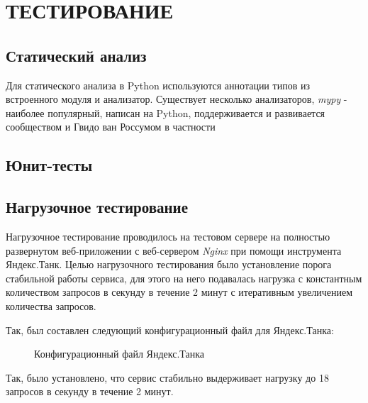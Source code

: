 \section{ТЕСТИРОВАНИЕ}
    \subsection{Статический анализ}
    Для статического анализа в Python используются аннотации типов из встроенного 
    модуля  и анализатор. Существует несколько анализаторов,
    \textit{mypy} - наиболее популярный, написан на Python, поддерживается и
    развивается сообществом и Гвидо ван Россумом в частности
    \subsection{Юнит-тесты}


    \subsection{Нагрузочное тестирование}
    Нагрузочное тестирование проводилось на тестовом сервере на полностью
    развернутом веб-приложении с веб-сервером \textit{Nginx} при помощи
    инструмента Яндекс.Танк. Целью нагрузочного тестирования было установление
    порога стабильной работы сервиса, для этого на него подавалась нагрузка
    с константным количеством запросов в секунду в течение 2 минут с итеративным
    увеличением количества запросов.

    Так, был составлен следующий конфигурационный файл для Яндекс.Танка:
    \begin{figure}[!h]
        \centering
        
        \caption{Конфигурационный файл Яндекс.Танка}
        \label{fig:tank_load}
    \end{figure}

    Так, было установлено, что сервис стабильно выдерживает нагрузку до 18
    запросов в секунду в течение 2 минут.
